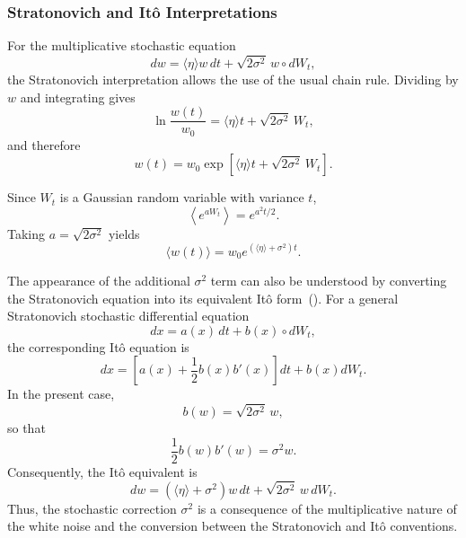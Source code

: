 \subsubsection{Stratonovich and It\^o Interpretations}

For the multiplicative stochastic equation
\begin{equation}
    dw
    =
    \langle\eta\rangle w\,dt
    +
    \sqrt{2\sigma^2}\,w\circ dW_t,
\end{equation}
the Stratonovich interpretation allows the use of the usual chain rule. Dividing by $w$ and integrating gives
\begin{equation}
    \ln\frac{w(t)}{w_0}
    =
    \langle\eta\rangle t
    +
    \sqrt{2\sigma^2}\,W_t,
\end{equation}
and therefore
\begin{equation}
    w(t)
    =
    w_0
    \exp\left[
        \langle\eta\rangle t
        +
        \sqrt{2\sigma^2}\,W_t
    \right].
\end{equation}

Since $W_t$ is a Gaussian random variable with variance $t$,
\begin{equation}
    \left\langle e^{aW_t}\right\rangle = e^{a^2t/2}.
\end{equation}
Taking $a=\sqrt{2\sigma^2}$ yields
\begin{equation}
\label{eq:mean-wealth-growth}
    \boxed{
    \langle w(t)\rangle
    =
    w_0
    e^{(\langle\eta\rangle+\sigma^2)t}
    }.
\end{equation}

The appearance of the additional $\sigma^2$ term can also be understood
by converting the Stratonovich equation into its equivalent It\^o form~(\cite{ito1944109, ito1941stochastic}).
For a general Stratonovich stochastic differential equation
\begin{equation}
    dx=a(x)\,dt+b(x)\circ dW_t,
\end{equation}
the corresponding It\^o equation is
\begin{equation}
    dx=
    \left[
        a(x)+\frac{1}{2}b(x)b'(x)
    \right]dt
    +
    b(x)dW_t.
\end{equation}
In the present case,
\begin{equation}
    b(w)=\sqrt{2\sigma^2}\,w,
\end{equation}
so that
\begin{equation}
    \frac{1}{2}b(w)b'(w)
    =
    \sigma^2w.
\end{equation}
Consequently, the It\^o equivalent is
\begin{equation}
    \boxed{
    dw
    =
    (\langle\eta\rangle+\sigma^2)w\,dt
    +
    \sqrt{2\sigma^2}\,w\,dW_t
    }.
\end{equation}
Thus, the stochastic correction $\sigma^2$ is a consequence of the
multiplicative nature of the white noise and the conversion between the
Stratonovich and It\^o conventions.

